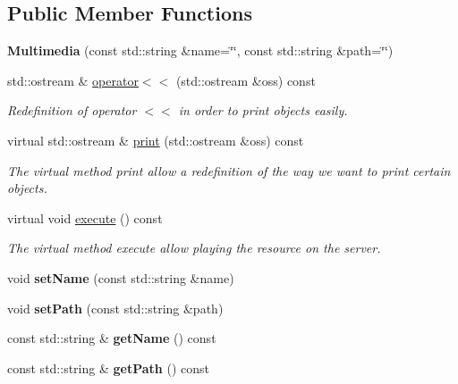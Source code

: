 \subsection*{Public Member Functions}
\begin{DoxyCompactItemize}
\item 
\hypertarget{class_multimedia_ac51930f687bcb9fd44392932c1f0e631}{{\bfseries Multimedia} (const std\-::string \&name=\char`\"{}\char`\"{}, const std\-::string \&path=\char`\"{}\char`\"{})}\label{class_multimedia_ac51930f687bcb9fd44392932c1f0e631}

\item 
\hypertarget{class_multimedia_aa4be8fe3f1749c95bc2bf591dd836b56}{std\-::ostream \& \hyperlink{class_multimedia_aa4be8fe3f1749c95bc2bf591dd836b56}{operator$<$$<$} (std\-::ostream \&oss) const }\label{class_multimedia_aa4be8fe3f1749c95bc2bf591dd836b56}

\begin{DoxyCompactList}\small\item\em Redefinition of operator $<$$<$ in order to print objects easily. \end{DoxyCompactList}\item 
virtual std\-::ostream \& \hyperlink{class_multimedia_a90d8b3e78733443b358409b117c14ffd}{print} (std\-::ostream \&oss) const 
\begin{DoxyCompactList}\small\item\em The virtual method print allow a redefinition of the way we want to print certain objects. \end{DoxyCompactList}\item 
\hypertarget{class_multimedia_adcabfa7365b1974a7911ae025815ec39}{virtual void \hyperlink{class_multimedia_adcabfa7365b1974a7911ae025815ec39}{execute} () const }\label{class_multimedia_adcabfa7365b1974a7911ae025815ec39}

\begin{DoxyCompactList}\small\item\em The virtual method execute allow playing the resource on the server. \end{DoxyCompactList}\item 
\hypertarget{class_multimedia_a7f76261a215bae20b9fafa18acb5ebd2}{void {\bfseries set\-Name} (const std\-::string \&name)}\label{class_multimedia_a7f76261a215bae20b9fafa18acb5ebd2}

\item 
\hypertarget{class_multimedia_a79367ce0f6fbd1d0c00ddb2bd6336ebb}{void {\bfseries set\-Path} (const std\-::string \&path)}\label{class_multimedia_a79367ce0f6fbd1d0c00ddb2bd6336ebb}

\item 
\hypertarget{class_multimedia_a6fff227dbb724674af160d1bde39815d}{const std\-::string \& {\bfseries get\-Name} () const }\label{class_multimedia_a6fff227dbb724674af160d1bde39815d}

\item 
\hypertarget{class_multimedia_aa89052d06db704f571e3c1b48bddeaa6}{const std\-::string \& {\bfseries get\-Path} () const }\label{class_multimedia_aa89052d06db704f571e3c1b48bddeaa6}

\end{DoxyCompactItemize}
